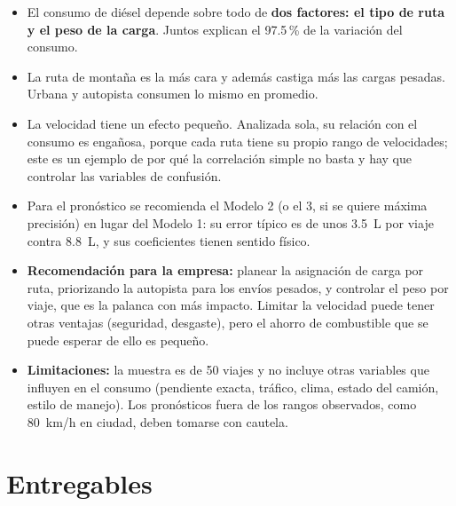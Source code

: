 \documentclass[12pt,letterpaper]{article}
\begin{document}
\begin{itemize}[itemsep=3pt]
  \item El consumo de diésel depende sobre todo de \textbf{dos factores: el tipo de ruta y el peso de la carga}. Juntos explican el 97.5\,\% de la variación del consumo.
  \item La ruta de montaña es la más cara y además castiga más las cargas pesadas. Urbana y autopista consumen lo mismo en promedio.
  \item La velocidad tiene un efecto pequeño. Analizada sola, su relación con el consumo es engañosa, porque cada ruta tiene su propio rango de velocidades; este es un ejemplo de por qué la correlación simple no basta y hay que controlar las variables de confusión.
  \item Para el pronóstico se recomienda el Modelo 2 (o el 3, si se quiere máxima precisión) en lugar del Modelo 1: su error típico es de unos 3.5~L por viaje contra 8.8~L, y sus coeficientes tienen sentido físico.
  \item \textbf{Recomendación para la empresa:} planear la asignación de carga por ruta, priorizando la autopista para los envíos pesados, y controlar el peso por viaje, que es la palanca con más impacto. Limitar la velocidad puede tener otras ventajas (seguridad, desgaste), pero el ahorro de combustible que se puede esperar de ello es pequeño.
  \item \textbf{Limitaciones:} la muestra es de 50 viajes y no incluye otras variables que influyen en el consumo (pendiente exacta, tráfico, clima, estado del camión, estilo de manejo). Los pronósticos fuera de los rangos observados, como 80~km/h en ciudad, deben tomarse con cautela.
\end{itemize}

\section{Entregables}
\end{document}
